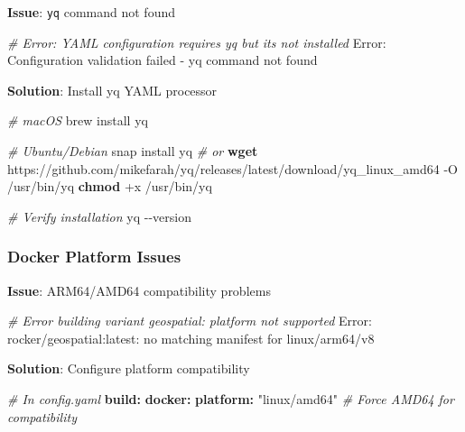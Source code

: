 \documentclass[
]{article}
\newenvironment{Shaded}{\begin{snugshade}}{\end{snugshade}}
\newcommand{\AttributeTok}[1]{\textcolor[rgb]{0.13,0.29,0.53}{#1}}
\newcommand{\CommentTok}[1]{\textcolor[rgb]{0.56,0.35,0.01}{\textit{#1}}}
\newcommand{\ExtensionTok}[1]{#1}
\newcommand{\FunctionTok}[1]{\textcolor[rgb]{0.13,0.29,0.53}{\textbf{#1}}}
\newcommand{\KeywordTok}[1]{\textcolor[rgb]{0.13,0.29,0.53}{\textbf{#1}}}
\newcommand{\NormalTok}[1]{#1}
\newcommand{\StringTok}[1]{\textcolor[rgb]{0.31,0.60,0.02}{#1}}
\begin{document}
\textbf{Issue}: \texttt{yq} command not found

\begin{Shaded}
\begin{Highlighting}[]
\CommentTok{\# Error: YAML configuration requires yq but it\textquotesingle{}s not installed}
\ExtensionTok{Error:}\NormalTok{ Configuration validation failed }\AttributeTok{{-}}\NormalTok{ yq command not found}
\end{Highlighting}
\end{Shaded}

\textbf{Solution}: Install yq YAML processor

\begin{Shaded}
\begin{Highlighting}[]
\CommentTok{\# macOS}
\ExtensionTok{brew}\NormalTok{ install yq}

\CommentTok{\# Ubuntu/Debian}
\ExtensionTok{snap}\NormalTok{ install yq}
\CommentTok{\# or}
\FunctionTok{wget}\NormalTok{ https://github.com/mikefarah/yq/releases/latest/download/yq\_linux\_amd64 }\AttributeTok{{-}O}\NormalTok{ /usr/bin/yq}
\FunctionTok{chmod}\NormalTok{ +x /usr/bin/yq}

\CommentTok{\# Verify installation}
\ExtensionTok{yq} \AttributeTok{{-}{-}version}
\end{Highlighting}
\end{Shaded}

\subsubsection{Docker Platform Issues}\label{docker-platform-issues}

\textbf{Issue}: ARM64/AMD64 compatibility problems

\begin{Shaded}
\begin{Highlighting}[]
\CommentTok{\# Error building variant \textquotesingle{}geospatial\textquotesingle{}: platform not supported}
\ExtensionTok{Error:}\NormalTok{ rocker/geospatial:latest: no matching manifest for linux/arm64/v8}
\end{Highlighting}
\end{Shaded}

\textbf{Solution}: Configure platform compatibility

\begin{Shaded}
\begin{Highlighting}[]
\CommentTok{\# In config.yaml}
\FunctionTok{build}\KeywordTok{:}
\AttributeTok{  }\FunctionTok{docker}\KeywordTok{:}
\AttributeTok{    }\FunctionTok{platform}\KeywordTok{:}\AttributeTok{ }\StringTok{"linux/amd64"}\CommentTok{  \# Force AMD64 for compatibility}
\end{Highlighting}
\end{Shaded}
\end{document}

